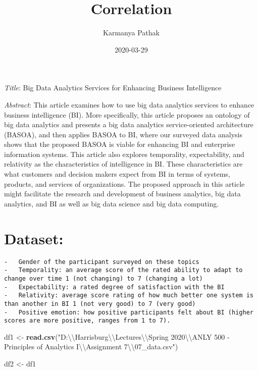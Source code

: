 \documentclass[
]{article}
\title{Correlation}
\author{Karmanya Pathak}
\date{2020-03-29}
\newenvironment{Shaded}{\begin{snugshade}}{\end{snugshade}}
\newcommand{\CharTok}[1]{\textcolor[rgb]{0.31,0.60,0.02}{#1}}
\newcommand{\KeywordTok}[1]{\textcolor[rgb]{0.13,0.29,0.53}{\textbf{#1}}}
\newcommand{\NormalTok}[1]{#1}
\newcommand{\StringTok}[1]{\textcolor[rgb]{0.31,0.60,0.02}{#1}}
\begin{document}
\maketitle

\emph{Title}: Big Data Analytics Services for Enhancing Business
Intelligence

\emph{Abstract}: This article examines how to use big data analytics
services to enhance business intelligence (BI). More specifically, this
article proposes an ontology of big data analytics and presents a big
data analytics service-oriented architecture (BASOA), and then applies
BASOA to BI, where our surveyed data analysis shows that the proposed
BASOA is viable for enhancing BI and enterprise information systems.
This article also explores temporality, expectability, and relativity as
the characteristics of intelligence in BI. These characteristics are
what customers and decision makers expect from BI in terms of systems,
products, and services of organizations. The proposed approach in this
article might facilitate the research and development of business
analytics, big data analytics, and BI as well as big data science and
big data computing.

\hypertarget{dataset}{%
\section{Dataset:}\label{dataset}}

\begin{verbatim}
-   Gender of the participant surveyed on these topics
-   Temporality: an average score of the rated ability to adapt to change over time 1 (not changing) to 7 (changing a lot)
-   Expectability: a rated degree of satisfaction with the BI
-   Relativity: average score rating of how much better one system is than another in BI 1 (not very good) to 7 (very good)
-   Positive emotion: how positive participants felt about BI (higher scores are more positive, ranges from 1 to 7).
\end{verbatim}

\begin{Shaded}
\begin{Highlighting}[]
\NormalTok{df1 <-}\StringTok{ }\KeywordTok{read.csv}\NormalTok{(}\StringTok{"D:}\CharTok{\textbackslash{}\textbackslash{}}\StringTok{Harrisburg}\CharTok{\textbackslash{}\textbackslash{}}\StringTok{Lectures}\CharTok{\textbackslash{}\textbackslash{}}\StringTok{Spring 2020}\CharTok{\textbackslash{}\textbackslash{}}\StringTok{ANLY 500 - Principles of Analytics I}\CharTok{\textbackslash{}\textbackslash{}}\StringTok{Assignment 7}\CharTok{\textbackslash{}\textbackslash{}}\StringTok{07_data.csv"}\NormalTok{)}

\NormalTok{df2 <-}\StringTok{ }\NormalTok{df1}
\end{Highlighting}
\end{Shaded}
\end{document}
